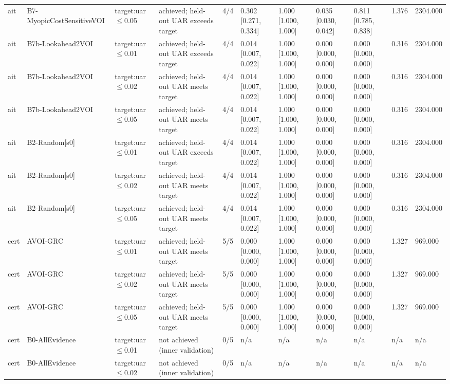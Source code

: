 \begin{table}[!ht]
{\begin{tabular}{lllllllllll}
ait & B7-MyopicCostSensitiveVOI & target:uar$\le$0.05 & achieved; held-out UAR exceeds target & 4/4 & 0.302 [0.271, 0.334] & 1.000 [1.000, 1.000] & 0.035 [0.030, 0.042] & 0.811 [0.785, 0.838] & 1.376 & 2304.000 \\
ait & B7b-Lookahead2VOI & target:uar$\le$0.01 & achieved; held-out UAR exceeds target & 4/4 & 0.014 [0.007, 0.022] & 1.000 [1.000, 1.000] & 0.000 [0.000, 0.000] & 0.000 [0.000, 0.000] & 0.316 & 2304.000 \\
ait & B7b-Lookahead2VOI & target:uar$\le$0.02 & achieved; held-out UAR meets target & 4/4 & 0.014 [0.007, 0.022] & 1.000 [1.000, 1.000] & 0.000 [0.000, 0.000] & 0.000 [0.000, 0.000] & 0.316 & 2304.000 \\
ait & B7b-Lookahead2VOI & target:uar$\le$0.05 & achieved; held-out UAR meets target & 4/4 & 0.014 [0.007, 0.022] & 1.000 [1.000, 1.000] & 0.000 [0.000, 0.000] & 0.000 [0.000, 0.000] & 0.316 & 2304.000 \\
ait & B2-Random[s0] & target:uar$\le$0.01 & achieved; held-out UAR exceeds target & 4/4 & 0.014 [0.007, 0.022] & 1.000 [1.000, 1.000] & 0.000 [0.000, 0.000] & 0.000 [0.000, 0.000] & 0.316 & 2304.000 \\
ait & B2-Random[s0] & target:uar$\le$0.02 & achieved; held-out UAR meets target & 4/4 & 0.014 [0.007, 0.022] & 1.000 [1.000, 1.000] & 0.000 [0.000, 0.000] & 0.000 [0.000, 0.000] & 0.316 & 2304.000 \\
ait & B2-Random[s0] & target:uar$\le$0.05 & achieved; held-out UAR meets target & 4/4 & 0.014 [0.007, 0.022] & 1.000 [1.000, 1.000] & 0.000 [0.000, 0.000] & 0.000 [0.000, 0.000] & 0.316 & 2304.000 \\
cert & AVOI-GRC & target:uar$\le$0.01 & achieved; held-out UAR meets target & 5/5 & 0.000 [0.000, 0.000] & 1.000 [1.000, 1.000] & 0.000 [0.000, 0.000] & 0.000 [0.000, 0.000] & 1.327 & 969.000 \\
cert & AVOI-GRC & target:uar$\le$0.02 & achieved; held-out UAR meets target & 5/5 & 0.000 [0.000, 0.000] & 1.000 [1.000, 1.000] & 0.000 [0.000, 0.000] & 0.000 [0.000, 0.000] & 1.327 & 969.000 \\
cert & AVOI-GRC & target:uar$\le$0.05 & achieved; held-out UAR meets target & 5/5 & 0.000 [0.000, 0.000] & 1.000 [1.000, 1.000] & 0.000 [0.000, 0.000] & 0.000 [0.000, 0.000] & 1.327 & 969.000 \\
cert & B0-AllEvidence & target:uar$\le$0.01 & not achieved (inner validation) & 0/5 & n/a & n/a & n/a & n/a & n/a & n/a \\
cert & B0-AllEvidence & target:uar$\le$0.02 & not achieved (inner validation) & 0/5 & n/a & n/a & n/a & n/a & n/a & n/a \\

\end{tabular}}
\end{table}
